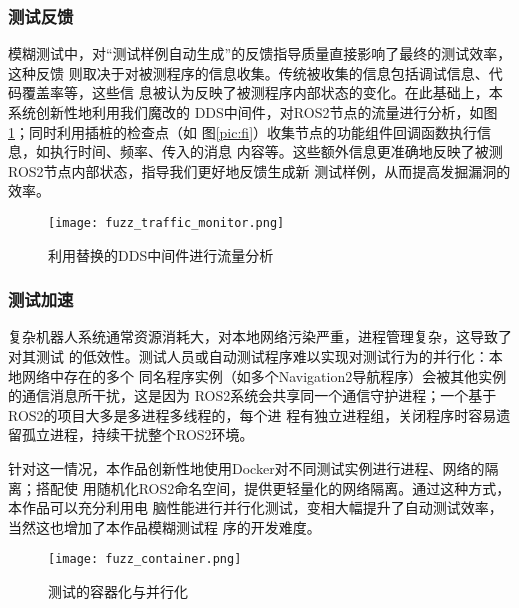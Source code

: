 \subsubsection{测试反馈}
模糊测试中，对“测试样例自动生成”的反馈指导质量直接影响了最终的测试效率，这种反馈
则取决于对被测程序的信息收集。传统被收集的信息包括调试信息、代码覆盖率等，这些信
息被认为反映了被测程序内部状态的变化。在此基础上，本系统创新性地利用我们魔改的
DDS中间件，对ROS2节点的流量进行分析，如图\ref{pic:ftm}；同时利用插桩的检查点（如
图\ref{pic:fi}）收集节点的功能组件回调函数执行信息，如执行时间、频率、传入的消息
内容等。这些额外信息更准确地反映了被测ROS2节点内部状态，指导我们更好地反馈生成新
测试样例，从而提高发掘漏洞的效率。

\begin{figure}[h]
    \centering
    \texttt{[image: fuzz\_traffic\_monitor.png]}
    \caption{利用替换的DDS中间件进行流量分析}
    \label{pic:ftm}
\end{figure}


\subsubsection{测试加速}

复杂机器人系统通常资源消耗大，对本地网络污染严重，进程管理复杂，这导致了对其测试
的低效性。测试人员或自动测试程序难以实现对测试行为的并行化：本地网络中存在的多个
同名程序实例（如多个Navigation2导航程序）会被其他实例的通信消息所干扰，这是因为
ROS2系统会共享同一个通信守护进程；一个基于ROS2的项目大多是多进程多线程的，每个进
程有独立进程组，关闭程序时容易遗留孤立进程，持续干扰整个ROS2环境。

针对这一情况，本作品创新性地使用Docker对不同测试实例进行进程、网络的隔离；搭配使
用随机化ROS2命名空间，提供更轻量化的网络隔离。通过这种方式，本作品可以充分利用电
脑性能进行并行化测试，变相大幅提升了自动测试效率，当然这也增加了本作品模糊测试程
序的开发难度。

\begin{figure}[h]
    \centering
    \texttt{[image: fuzz\_container.png]}
    \caption{测试的容器化与并行化}
    \label{pic:fc}
\end{figure}

